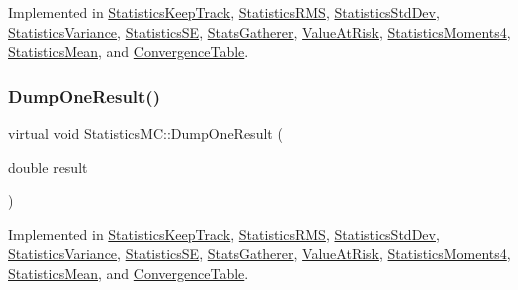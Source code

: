Implemented in \hyperlink{classStatisticsKeepTrack_a09c6aad9bb77548e267fe4f5ae7d99dd}{Statistics\+Keep\+Track}, \hyperlink{classStatisticsRMS_af14e9befb5bfdb68b70e2e3e68206081}{Statistics\+R\+MS}, \hyperlink{classStatisticsStdDev_a13d8861fc23c9bb99e46e725e014a6b9}{Statistics\+Std\+Dev}, \hyperlink{classStatisticsVariance_aed63efacc9d231e9ae00625d0c7efd81}{Statistics\+Variance}, \hyperlink{classStatisticsSE_a935f22f6610e3a9ad584a8805293d740}{Statistics\+SE}, \hyperlink{classStatsGatherer_a07a78e389d948bfc0809ccf57c0dd811}{Stats\+Gatherer}, \hyperlink{classValueAtRisk_a8fc9a8f4f9449a04ed177272c0931619}{Value\+At\+Risk}, \hyperlink{classStatisticsMoments4_a7196986cea84e8d9589ac51d50eaba15}{Statistics\+Moments4}, \hyperlink{classStatisticsMean_a2ef95157e57b138a50c7c6d451a366e3}{Statistics\+Mean}, and \hyperlink{classConvergenceTable_a129d95361fa2dd5a6ad43d4320f40682}{Convergence\+Table}.

\hypertarget{classStatisticsMC_a3ab5fb27d6933d8e35b2a55c3897cbe3}{}\label{classStatisticsMC_a3ab5fb27d6933d8e35b2a55c3897cbe3} 
\subsubsection{\texorpdfstring{Dump\+One\+Result()}{DumpOneResult()}}
{\footnotesize\ttfamily virtual void Statistics\+M\+C\+::\+Dump\+One\+Result (\begin{DoxyParamCaption}\item[{double}]{result }\end{DoxyParamCaption})\hspace{0.3cm}{\ttfamily [pure virtual]}}



Implemented in \hyperlink{classStatisticsKeepTrack_aaee86e9b5d2223f0c07725056cd55c8b}{Statistics\+Keep\+Track}, \hyperlink{classStatisticsRMS_af9c972ac6ee7938f6690a99ee51b5771}{Statistics\+R\+MS}, \hyperlink{classStatisticsStdDev_a824017c76562426a4fd640ef8a909a5e}{Statistics\+Std\+Dev}, \hyperlink{classStatisticsVariance_a403368dde195a18fe4ce64e41854d493}{Statistics\+Variance}, \hyperlink{classStatisticsSE_a3628cdafd9ed239168b4fc50db7f1e1e}{Statistics\+SE}, \hyperlink{classStatsGatherer_ae7f7e9ad4a0b0491dbcbcc27f93a89ff}{Stats\+Gatherer}, \hyperlink{classValueAtRisk_ad61f71fb24d6b6f4825e813137d4ef73}{Value\+At\+Risk}, \hyperlink{classStatisticsMoments4_aa68d32f4eda0c2be64ef35ebac9bbe0b}{Statistics\+Moments4}, \hyperlink{classStatisticsMean_a4e57d592c77b52e1d8b3985ab221c33c}{Statistics\+Mean}, and \hyperlink{classConvergenceTable_ae4ebb3988c6a8bc4e81049bfacf388e2}{Convergence\+Table}.

